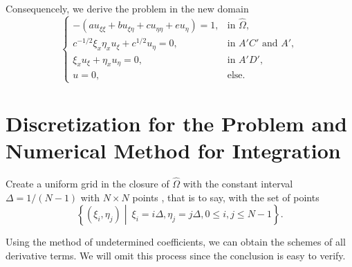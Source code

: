\documentclass{assignment}[2019/10/15]
\newcommand{\Oh}{\hat{\Omega}}
\newcommand{\ux}{{u_\xi}}
\newcommand{\ue}{{u_\eta}}
\newcommand{\uxx}{{u_{\xi\xi}}}
\newcommand{\uxe}{{u_{\xi\eta}}}
\newcommand{\uee}{{u_{\eta\eta}}}
\begin{document}
    Consequencely, we derive the problem in the new domain
    \begin{equation}
        \begin{cases}
            -(a\uxx+b\uxe+c\uee+e\ue) = 1, &\text{in }\Oh,\\
            c^{-1/2}\xi_x\eta_x\ux+c^{1/2}\ue=0, &\text{in }A'C'\text{ and }A',\\
            \xi_x\ux+\eta_x\ue=0, &\text{in }A'D',\\
            u = 0, &\text{else}.
        \end{cases}
    \end{equation}

    \section{Discretization for the Problem and Numerical Method for Integration}

    Create a uniform grid in the closure of $\Oh$ with the constant interval $\Delta = 1/(N-1)$ with $N\times N$ points , that is to say, with the set of points
    \begin{equation}
        \left\{(\xi_i, \eta_j)\middle\vert\ \xi_i = i\Delta, \eta_j = j\Delta, 0\leq i,j\leq N-1\right\}.
    \end{equation}

    Using the method of undetermined coefficients, we can obtain the schemes of all derivative terms. We will omit this process since the conclusion is easy to verify.
\end{document}
